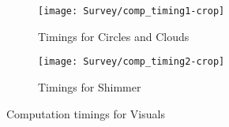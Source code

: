 \documentclass[../initial_thesis.tex]{subfiles}
\begin{document}
\begin{figure}
  \begin{subfigure}{0.5\textwidth}
    \centering
    \texttt{[image: Survey/comp\_timing1-crop]}
    \caption{Timings for Circles and Clouds}
    \label{fig:timings_circlesclouds}
  \end{subfigure}
  \begin{subfigure}{0.5\textwidth}
    \centering
    \texttt{[image: Survey/comp\_timing2-crop]}
    \caption{Timings for Shimmer}
    \label{fig:timings_shimmer}
  \end{subfigure}
  \caption{Computation timings for Visuals}
  \label{fig:comp_timings}
\end{figure}
\end{document}
